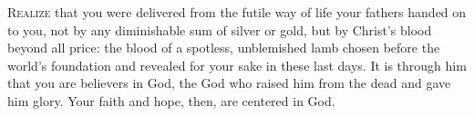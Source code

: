 \lettrine[lines=2,loversize=0.15]{R}{ealize} that you were delivered from the futile way of life your fathers handed on to you, not by any diminishable sum of silver or gold, but by Christ’s blood beyond all price: the blood of a spotless, unblemished lamb chosen before the world’s foundation and revealed for your sake in these last days. It is through him that you are believers in God, the God who raised him from the dead and gave him glory. Your faith and hope, then, are centered in God.